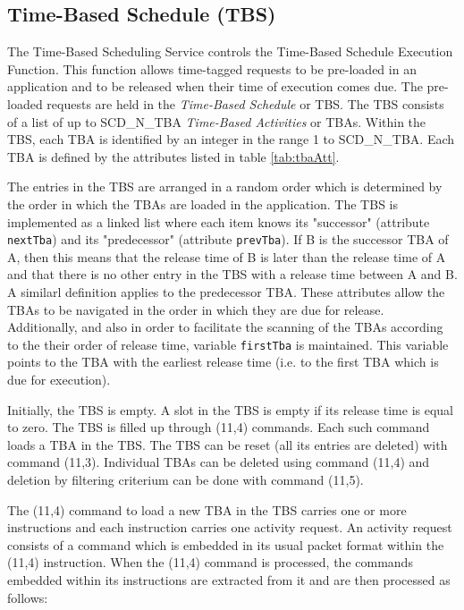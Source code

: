 \documentclass{pnp_article}
\begin{document}
\subsection{Time-Based Schedule (TBS)}
The Time-Based Scheduling Service controls the Time-Based Schedule Execution Function. This function allows time-tagged requests to be pre-loaded in an application and to be released when their time of execution comes due. The pre-loaded requests are held in the \textit{Time-Based Schedule} or TBS. The TBS consists of a list of up to SCD\_N\_TBA \textit{Time-Based Activities} or TBAs. Within the TBS, each TBA is identified by an integer in the range 1 to SCD\_N\_TBA. Each TBA is defined by the attributes listed in table \ref{tab:tbaAtt}. 

The entries in the TBS are arranged in a random order which is determined by the order in which the TBAs are loaded in the application. The TBS is implemented as a linked list where each item knows its "successor" (attribute \texttt{nextTba}) and its "predecessor" (attribute \texttt{prevTba}). If B is the successor TBA of A, then this means that the release time of B is later than the release time of A and that there is no other entry in the TBS with a release time between A and B. A similarl definition applies to the predecessor TBA. These attributes allow the TBAs to be navigated in the order in which they are due for release. Additionally, and also in order to facilitate the scanning of the TBAs according to the their order of release time, variable \texttt{firstTba} is maintained. This variable points to the TBA with the earliest release time (i.e. to the first TBA which is due for execution). 

Initially, the TBS is empty. A slot in the TBS is empty if its release time is equal to zero. The TBS is filled up through (11,4) commands. Each such command loads a TBA in the TBS. The TBS can be reset (all its entries are deleted) with command (11,3). Individual TBAs can be deleted using command (11,4) and deletion by filtering criterium can be done with command (11,5).

The (11,4) command to load a new TBA in the TBS carries one or more instructions and each instruction carries one activity request. An activity request consists of a command which is embedded in its usual packet format within the (11,4) instruction. When the (11,4) command is processed, the commands embedded within its instructions are extracted from it and are then processed as follows:
\end{document}
